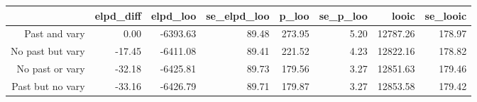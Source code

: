 \begin{table}[ht]
\centering
\begin{tabular}{rrrrrrrr}
  \hline
 & elpd\_diff & elpd\_loo & se\_elpd\_loo & p\_loo & se\_p\_loo & looic & se\_looic \\ 
  \hline
Past and vary & 0.00 & -6393.63 & 89.48 & 273.95 & 5.20 & 12787.26 & 178.97 \\ 
  No past but vary & -17.45 & -6411.08 & 89.41 & 221.52 & 4.23 & 12822.16 & 178.82 \\ 
  No past or vary & -32.18 & -6425.81 & 89.73 & 179.56 & 3.27 & 12851.63 & 179.46 \\ 
  Past but no vary & -33.16 & -6426.79 & 89.71 & 179.87 & 3.27 & 12853.58 & 179.42 \\ 
   \hline
\end{tabular}
\end{table}
